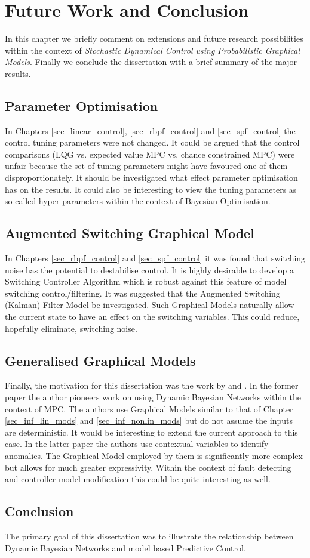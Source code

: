 \chapter{Future Work and Conclusion}
In this chapter we briefly comment on extensions and future research possibilities within the context of \textit{Stochastic Dynamical Control using Probabilistic Graphical Models}. Finally we conclude the dissertation with a brief summary of the major results.

\section{Parameter Optimisation}
In Chapters \ref{sec_linear_control}, \ref{sec_rbpf_control} and \ref{sec_spf_control} the control tuning parameters were not changed. It could be argued that the control comparisons (LQG vs. expected value MPC vs. chance constrained MPC) were unfair because the set of tuning parameters might have favoured one of them disproportionately. It should be investigated what effect parameter optimisation has on the results. It could also be interesting to view the tuning parameters as so-called hyper-parameters within the context of Bayesian Optimisation. 

\section{Augmented Switching Graphical Model}
In Chapters \ref{sec_rbpf_control} and \ref{sec_spf_control} it was found that switching noise has the potential to destabilise control. It is highly desirable to develop a Switching Controller Algorithm which is robust against this feature of model switching control/filtering. It was suggested that the Augmented Switching (Kalman) Filter Model be investigated. Such Graphical Models naturally allow the current state to have an effect on the switching variables. This could reduce, hopefully eliminate, switching noise. 

\section{Generalised Graphical Models}
Finally, the motivation for this dissertation was the work by \cite{devilliers} and \cite{dabrowski}. In the former paper the author pioneers work on using Dynamic Bayesian Networks within the context of MPC. The authors use Graphical Models similar to that of Chapter \ref{sec_inf_lin_mods} and \ref{sec_inf_nonlin_mods} but do not assume the inputs are deterministic. It would be interesting to extend the current approach to this case. In the latter paper the authors use contextual variables to identify anomalies. The Graphical Model employed by them is significantly more complex but allows for much greater expressivity. Within the context of fault detecting and controller model modification this could be quite interesting as well.

\section{Conclusion}
The primary goal of this dissertation was to illustrate the relationship between Dynamic Bayesian Networks and model based Predictive Control. 